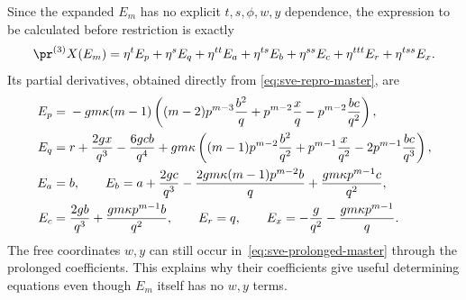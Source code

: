 Since the expanded $E_m$ has no explicit $t,s,\phi,w,y$ dependence, the
expression to be calculated before restriction is exactly
\begin{equation}
 \pr^{(3)}X(E_m)=\eta^t E_p+\eta^s E_q+\eta^{tt}E_a
       +\eta^{ts}E_b+\eta^{ss}E_c+\eta^{ttt}E_r+\eta^{tss}E_x.
 \label{eq:sve-prolonged-master}
\end{equation}
Its partial derivatives, obtained directly from
\eqref{eq:sve-repro-master}, are
\begin{align}
 E_p={}&-gm\kappa(m-1)\left((m-2)p^{m-3}\frac{b^2}{q}
               +p^{m-2}\frac{x}{q}-p^{m-2}\frac{bc}{q^2}\right),\notag\\
 E_q={}&r+\frac{2gx}{q^3}-\frac{6gcb}{q^4}
       +gm\kappa\left((m-1)p^{m-2}\frac{b^2}{q^2}
           +p^{m-1}\frac{x}{q^2}-2p^{m-1}\frac{bc}{q^3}\right),\notag\\
 E_a={}&b,\qquad
 E_b=a+\frac{2gc}{q^3}-\frac{2gm\kappa(m-1)p^{m-2}b}{q}
                         +\frac{gm\kappa p^{m-1}c}{q^2},\notag\\
 E_c={}&\frac{2gb}{q^3}+\frac{gm\kappa p^{m-1}b}{q^2},\qquad
 E_r=q,\qquad E_x=-\frac{g}{q^2}-\frac{gm\kappa p^{m-1}}q.
 \label{eq:sve-master-partials}
\end{align}
The free coordinates $w,y$ can still occur in~\eqref{eq:sve-prolonged-master}
through the prolonged coefficients. This explains why their coefficients
give useful determining equations even though $E_m$ itself has no $w,y$ terms.

